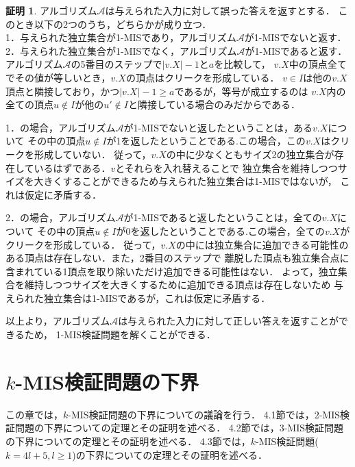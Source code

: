 \documentclass[12pt]{thesis}
\theoremstyle{definition}
\newtheorem*{prf*}{証明}
\begin{document}
\begin{prf*}
アルゴリズム$\mathcal{A}$は与えられた入力に対して誤った答えを返すとする．
このとき以下の2つのうち，どちらかが成り立つ． \\
1．与えられた独立集合が1-MISであり，アルゴリズム$\mathcal{A}$が1-MISでないと返す． \\
2．与えられた独立集合が1-MISでなく，アルゴリズム$\mathcal{A}$が1-MISであると返す． \\

アルゴリズム$\mathcal{A}$の5番目のステップで$|v.X| - 1$と$a$を比較して，
$v.X$中の頂点全てでその値が等しいとき，$v.X$の頂点はクリークを形成している．
$v \in I$は他の$v.X$頂点と隣接しており，かつ$|v.X| - 1 \geq a$であるが，等号が成立するのは
$v.X$内の全ての頂点$u \notin I$が他の$u' \notin I$と隣接している場合のみだからである．

1．の場合，アルゴリズム$\mathcal{A}$が1-MISでないと返したということは，ある$v.X$について
その中の頂点$u \notin I$が1を返したということである.この場合，この$v.X$はクリークを形成していない．
従って，$v.X$の中に少なくともサイズ2の独立集合が存在しているはずである．$v$とそれらを入れ替えることで
独立集合を維持しつつサイズを大きくすることができるため与えられた独立集合は1-MISではないが，
これは仮定に矛盾する． 

2．の場合，アルゴリズム$\mathcal{A}$が1-MISであると返したということは，全ての$v.X$について
その中の頂点$u \notin I$が0を返したということである.この場合，全ての$v.X$がクリークを形成している．
従って，$v.X$の中には独立集合に追加できる可能性のある頂点は存在しない．また，2番目のステップで
離脱した頂点も独立集合点に含まれている1頂点を取り除いただけ追加できる可能性はない．
よって，独立集合を維持しつつサイズを大きくするために追加できる頂点は存在しないため
与えられた独立集合は1-MISであるが，これは仮定に矛盾する． 

以上より，アルゴリズム$\mathcal{A}$は与えられた入力に対して正しい答えを返すことができるため，
1-MIS検証問題を解くことができる．
\end{prf*}
\newpage

\chapter{$k$-MIS検証問題の下界}
この章では，$k$-MIS検証問題の下界についての議論を行う．
4.1節では，2-MIS検証問題の下界についての定理とその証明を述べる．
4.2節では，3-MIS検証問題の下界についての定理とその証明を述べる．
4.3節では，$k$-MIS検証問題($k = 4l + 5, l \geq 1$)の下界についての定理とその証明を述べる．
\end{document}
